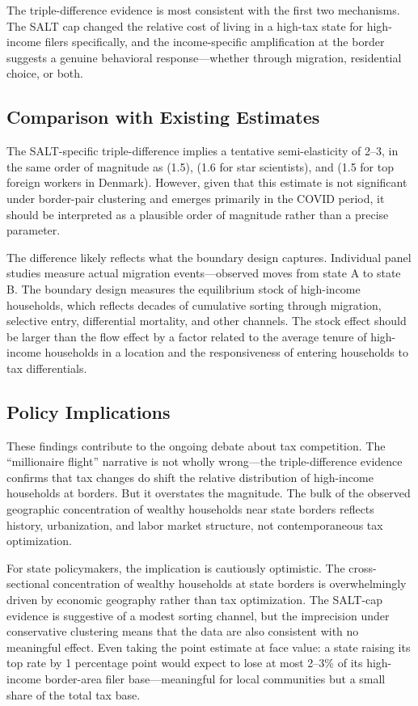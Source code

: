 \documentclass[12pt]{article}
\begin{document}
The triple-difference evidence is most consistent with the first two mechanisms. The SALT cap changed the relative cost of living in a high-tax state for high-income filers specifically, and the income-specific amplification at the border suggests a genuine behavioral response---whether through migration, residential choice, or both.

\subsection{Comparison with Existing Estimates}

The SALT-specific triple-difference implies a tentative semi-elasticity of 2--3, in the same order of magnitude as \citet{young2016millionaire} (1.5), \citet{moretti2017effect} (1.6 for star scientists), and \citet{kleven2014migration} (1.5 for top foreign workers in Denmark). However, given that this estimate is not significant under border-pair clustering and emerges primarily in the COVID period, it should be interpreted as a plausible order of magnitude rather than a precise parameter.

The difference likely reflects what the boundary design captures. Individual panel studies measure actual migration events---observed moves from state A to state B. The boundary design measures the equilibrium stock of high-income households, which reflects decades of cumulative sorting through migration, selective entry, differential mortality, and other channels. The stock effect should be larger than the flow effect by a factor related to the average tenure of high-income households in a location and the responsiveness of entering households to tax differentials.

\subsection{Policy Implications}

These findings contribute to the ongoing debate about tax competition. The ``millionaire flight'' narrative is not wholly wrong---the triple-difference evidence confirms that tax changes do shift the relative distribution of high-income households at borders. But it overstates the magnitude. The bulk of the observed geographic concentration of wealthy households near state borders reflects history, urbanization, and labor market structure, not contemporaneous tax optimization.

For state policymakers, the implication is cautiously optimistic. The cross-sectional concentration of wealthy households at state borders is overwhelmingly driven by economic geography rather than tax optimization. The SALT-cap evidence is suggestive of a modest sorting channel, but the imprecision under conservative clustering means that the data are also consistent with no meaningful effect. Even taking the point estimate at face value: a state raising its top rate by 1 percentage point would expect to lose at most 2--3\% of its high-income border-area filer base---meaningful for local communities but a small share of the total tax base.
\end{document}
